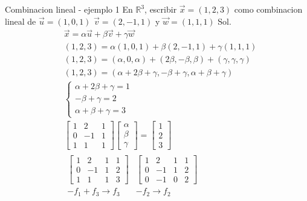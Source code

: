 \begin{Example*} {Combinacion lineal - ejemplo 1}
	En $\mathbb{R}^3$, escribir $\vec{x}=(1,2,3)$ como combinacion lineal de $\vec{u}=(1,0,1)$ $\vec{v}=(2,-1,1)$ y $\vec{w}=(1,1,1)$
	Sol.
	\begin{align*}
		&\vec{x}=\alpha\vec{u}+\beta\vec{v}+\gamma\vec{w}\\
		&(1,2,3)=\alpha(1,0,1)+\beta(2,-1,1)+\gamma(1,1,1)\\
		&(1,2,3)=(\alpha,0,\alpha)+(2\beta,-\beta,\beta)+(\gamma,\gamma,\gamma)\\
		&(1,2,3)=(\alpha+2\beta+\gamma,-\beta+\gamma,\alpha+\beta+\gamma)\\
		&\left\{\begin{array}{r}
			\alpha+2\beta+\gamma=1\\
			-\beta+\gamma=2\\
			\alpha+\beta+\gamma=3
		\end{array}\right.\\
		&\begin{bmatrix}
			1&2&1\\
			0&-1&1\\
			1&1&1
		\end{bmatrix}\begin{bmatrix}
			\alpha\\
			\beta\\
			\gamma
		\end{bmatrix}=\begin{bmatrix}
		 	1\\2\\3
		\end{bmatrix}\\
		&\begin{array}{c}
			\left[\begin{array}{ccc|c}
				1&2&1&1\\
				0&-1&1&2\\
				1&1&1&3
			\end{array}\right]\\
			-f_1+f_3\rightarrow f_3
		\end{array}\begin{array}{c}
			\left[\begin{array}{ccc|c}
				1&2&1&1\\
				0&-1&1&2\\
				0&-1&0&2
			\end{array}\right]\\
			-f_2\rightarrow f_2
		\end{array}\\

\end{align*}
\end{Example*}
